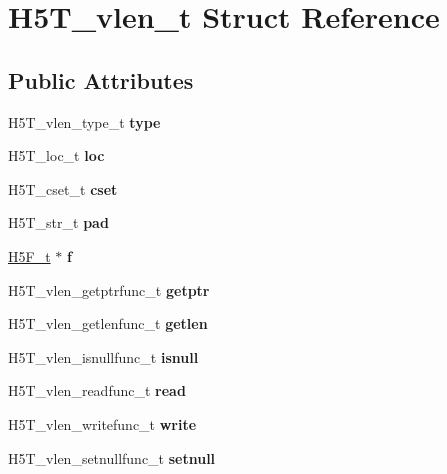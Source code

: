 \hypertarget{struct_h5_t__vlen__t}{}\section{H5\+T\+\_\+vlen\+\_\+t Struct Reference}
\label{struct_h5_t__vlen__t}
\subsection*{Public Attributes}
\begin{DoxyCompactItemize}
\item 
\mbox{\label{struct_h5_t__vlen__t_ace6bd8601a034b94381ae0afaf3fef00}} 
H5\+T\+\_\+vlen\+\_\+type\+\_\+t {\bfseries type}
\item 
\mbox{\label{struct_h5_t__vlen__t_afb00f29e2587986298973bd4951a5b8d}} 
H5\+T\+\_\+loc\+\_\+t {\bfseries loc}
\item 
\mbox{\label{struct_h5_t__vlen__t_a461cc9df14db824cd7545f424846ddf3}} 
H5\+T\+\_\+cset\+\_\+t {\bfseries cset}
\item 
\mbox{\label{struct_h5_t__vlen__t_ae6c924594bb329ec6cb01d1dcdcbdfab}} 
H5\+T\+\_\+str\+\_\+t {\bfseries pad}
\item 
\mbox{\label{struct_h5_t__vlen__t_ab913137a6c1f3acafab6c1e0d3b6ecf8}} 
\hyperlink{struct_h5_f__t}{H5\+F\+\_\+t} $\ast$ {\bfseries f}
\item 
\mbox{\label{struct_h5_t__vlen__t_adffac792f5ec84b2aa3361a4a02b8e12}} 
H5\+T\+\_\+vlen\+\_\+getptrfunc\+\_\+t {\bfseries getptr}
\item 
\mbox{\label{struct_h5_t__vlen__t_ae96ac781e654e61ab3cc1561abb16735}} 
H5\+T\+\_\+vlen\+\_\+getlenfunc\+\_\+t {\bfseries getlen}
\item 
\mbox{\label{struct_h5_t__vlen__t_a11530cca7626728676ef513a6d720a09}} 
H5\+T\+\_\+vlen\+\_\+isnullfunc\+\_\+t {\bfseries isnull}
\item 
\mbox{\label{struct_h5_t__vlen__t_a445a519647c0cd535f02014cbc076836}} 
H5\+T\+\_\+vlen\+\_\+readfunc\+\_\+t {\bfseries read}
\item 
\mbox{\label{struct_h5_t__vlen__t_ad047438d8747112e1097328e992233ae}} 
H5\+T\+\_\+vlen\+\_\+writefunc\+\_\+t {\bfseries write}
\item 
\mbox{\label{struct_h5_t__vlen__t_a24c27ef2233c2fae0b800474262f264d}} 
H5\+T\+\_\+vlen\+\_\+setnullfunc\+\_\+t {\bfseries setnull}
\end{DoxyCompactItemize}


